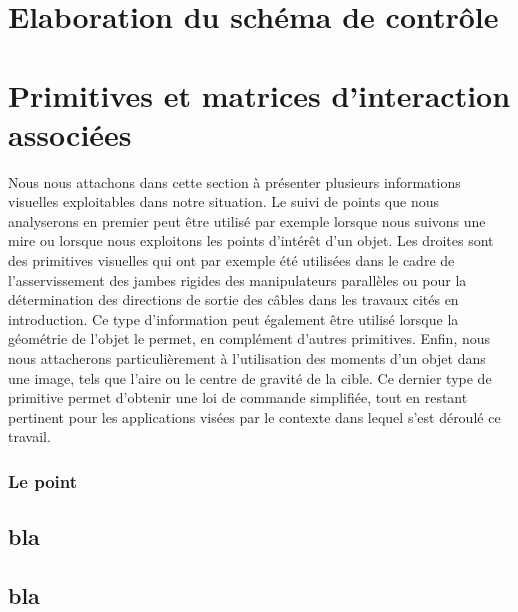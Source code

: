 \section{Elaboration du sch\'ema de contr\^ole}

\section{Primitives et matrices d'interaction associ\'ees}

Nous nous attachons dans cette section \`a pr\'esenter plusieurs informations 
visuelles exploitables dans notre situation. Le suivi de points que nous 
analyserons en premier peut \^etre utilis\'e par exemple lorsque nous suivons 
une mire ou lorsque nous exploitons les points d'int\'er\^et d'un objet. Les 
droites sont des primitives visuelles qui ont par exemple \'et\'e utilis\'ees 
dans le cadre de l'asservissement des jambes rigides des manipulateurs 
parall\`eles ou pour la d\'etermination des directions de sortie des c\^ables 
dans les travaux cit\'es en introduction. Ce type d'information peut 
\'egalement \^etre utilis\'e lorsque la g\'eom\'etrie de l'objet le permet, en 
compl\'ement d'autres primitives. Enfin, nous nous attacherons 
particuli\`erement \`a l'utilisation des moments d'un objet dans une image, 
tels que l'aire ou le centre de gravit\'e de la cible. Ce dernier type de 
primitive permet d'obtenir une loi de commande simplifi\'ee, tout en restant 
pertinent pour les applications vis\'ees par le contexte dans lequel s'est 
d\'eroul\'e ce travail.

\subsubsection{Le point}


\subsection{bla}

\subsection{bla}


 